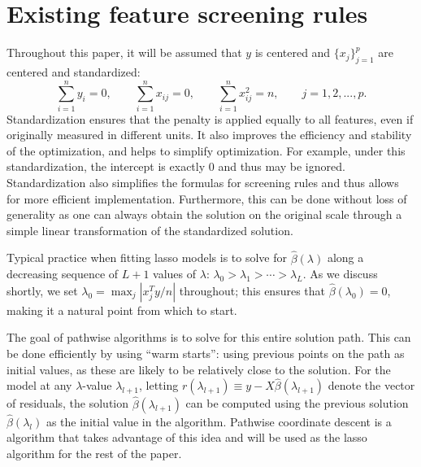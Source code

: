 \section{Existing feature screening rules}
\label{sec:existing}

Throughout this paper, it will be assumed that $y$ is centered and $\{x_j\}_{j=1}^p$ are centered and standardized:
\begin{equation}
  \label{eq:std}
  \sum_{i=1}^ny_i=0, \qquad \sum_{i=1}^n x_{ij}=0, \qquad \sum_{i=1}^n x_{ij}^2=n,\qquad j=1,2,...,p.
\end{equation}
Standardization ensures that the penalty is applied equally to all features, even if originally measured in different units. It also improves the efficiency and stability of the optimization, and helps to simplify optimization.  For example, under this standardization, the intercept is exactly 0 and thus may be ignored.  Standardization also simplifies the formulas for screening rules and thus allows for more efficient implementation.  Furthermore, this can be done without loss of generality as one can always obtain the solution on the original scale through a simple linear transformation of the standardized solution.

Typical practice when fitting lasso models is to solve for $\hat{\beta}(\lambda)$ along a decreasing sequence of $L+1$ values of $\lambda$: $\lambda_0 > \lambda_1 > \cdots > \lambda_L$.  As we discuss shortly, we set $\lambda_0=\max_j|x_j^Ty/n|$ throughout; this ensures that $\hat{\beta}(\lambda_0)=0$, making it a natural point from which to start.

The goal of pathwise algorithms is to solve for this entire solution path.  This can be done efficiently by using ``warm starts'': using previous points on the path as initial values, as these are likely to be relatively close to the solution.  For the model at any $\lambda$-value $\lambda_{l+1}$, letting $r(\lambda_{l+1}) \equiv y-X\hat{\beta}(\lambda_{l+1})$ denote the vector of residuals, the solution $\hat{\beta}(\lambda_{l+1})$ can be computed using the previous solution $\hat{\beta}(\lambda_l)$ as the initial value in the algorithm. Pathwise coordinate descent is a algorithm that takes advantage of this idea and will be used as the lasso algorithm for the rest of the paper.

